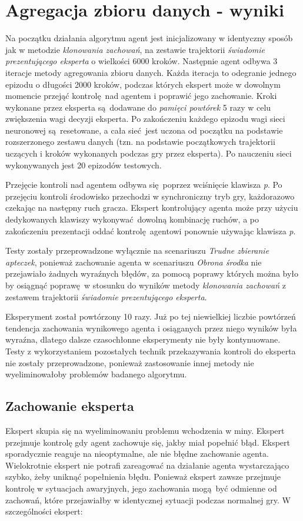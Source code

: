 \section{Agregacja zbioru danych - wyniki}

Na początku działania algorytmu agent jest inicjalizowany w identyczny sposób jak w metodzie \textit{klonowania zachowań}, na zestawie trajektorii \textit{świadomie prezentującego eksperta} o wielkości 6000 kroków. Następnie agent odbywa 3 iteracje metody agregowania zbioru danych. Każda iteracja to odegranie jednego epizodu o długości 2000 kroków, podczas których ekspert może w dowolnym momencie przejąć kontrolę nad agentem i poprawić jego zachowanie. Kroki wykonane przez eksperta są dodawane do \textit{pamięci powtórek} 5 razy w celu zwiększenia wagi decyzji eksperta. Po zakończeniu każdego epizodu wagi sieci neuronowej są resetowane, a cała sieć jest uczona od początku na podstawie rozszerzonego zestawu danych (tzn. na podstawie początkowych trajektorii uczących i kroków wykonanych podczas gry przez eksperta). Po nauczeniu sieci wykonywanych jest 20 epizodów testowych.

Przejęcie kontroli nad agentem odbywa się poprzez wciśnięcie klawisza \textit{p}. Po przejęciu kontroli środowisko przechodzi w synchroniczny tryb gry, każdorazowo czekając na następny ruch gracza. Ekspert kontrolujący agenta może przy użyciu dedykowanych klawiszy wykonywać dowolną kombinację ruchów, a po zakończeniu prezentacji oddać kontrolę agentowi ponownie używając klawisza \textit{p}.

Testy zostały przeprowadzone wyłącznie na scenariuszu \textit{Trudne zbieranie apteczek}, ponieważ zachowanie agenta w scenariuszu \textit{Obrona środka} nie przejawiało żadnych wyraźnych błędów, za pomocą poprawy których można było by osiągnąć poprawę w stosunku do wyników metody \textit{klonowania zachowań} z zestawem trajektorii \textit{świadomie prezentującego eksperta}.

Eksperyment został powtórzony 10 razy. Już po tej niewielkiej liczbie powtórzeń tendencja zachowania wynikowego agenta i osiąganych przez niego wyników była wyraźna, dlatego dalsze czasochłonne eksperymenty nie były kontynuowane. Testy z wykorzystaniem pozostałych technik przekazywania kontroli do eksperta nie zostały przeprowadzone, ponieważ zastosowanie innej metody nie wyeliminowałoby problemów badanego algorytmu.

\subsection {Zachowanie eksperta}
Ekspert skupia się na wyeliminowaniu problemu wchodzenia w miny. Ekspert przejmuje kontrolę gdy agent zachowuje się, jakby miał popełnić błąd. Ekspert sporadycznie reaguje na nieoptymalne, ale nie błędne zachowanie agenta. Wielokrotnie ekspert nie potrafi zareagować na działanie agenta wystarczająco szybko, żeby uniknąć popełnienia błędu. Ponieważ ekspert zawsze przejmuje kontrolę w sytuacjach awaryjnych, jego zachowania mogą być odmienne od zachowań, które przejawiałby w identycznej sytuacji podczas normalnej gry. W szczególności ekspert:

